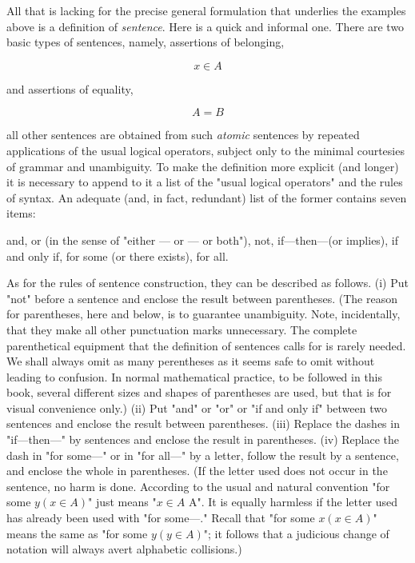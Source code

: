 All that is lacking for the precise general formulation that underlies the examples above is a definition of \textit{sentence}. Here is a quick and informal one. There are two basic types of sentences, namely, assertions of belonging,

\begin{equation*}
x \in A
\end{equation*}

and assertions of equality, 

\begin{equation*}
A = B
\end{equation*}

all other sentences are obtained from such \textit{atomic} sentences by repeated applications of the usual logical operators, subject only to the minimal courtesies of grammar and unambiguity. To make the definition more explicit (and longer) it is necessary to append to it a list of the "usual logical operators" and the rules of syntax. An adequate (and, in fact, redundant) list of the former contains seven items:
 
and, 
or (in the sense of "either — or — or both"), 
not, 
if—then—(or implies),
if and only if,
for some (or there exists),
for all. 

As for the rules of sentence construction, they can be described as follows. (i) Put "not" before a sentence and enclose the result between parentheses. (The reason for parentheses, here and below, is to guarantee unambiguity. Note, incidentally, that they make all other punctuation marks unnecessary. The complete parenthetical equipment that the definition of sentences calls for is rarely needed. We shall always omit as many perentheses as it seems safe to omit without leading to confusion. In normal mathematical practice, to be followed in this book, several different sizes and shapes of parentheses are used, but that is for visual convenience only.) (ii) Put "and" or "or" or "if and only if" between two sentences and enclose the result between parentheses. (iii) Replace the dashes in "if—then—" by sentences and enclose the result in parentheses. (iv) Replace the dash in "for some—" or in "for all—" by a letter, follow the result by a sentence, and enclose the whole in parentheses. (If the letter used does not occur in the sentence, no harm is done. According to the usual and natural convention "for some $y (x \in A)$" just means "$ x \in A$ A". It is equally harmless if the letter used has already been used with "for some—." Recall that "for some $x (x \in A)$" means the same as  "for some $ y (y \in A)$"; it follows that a judicious change of notation will always avert alphabetic collisions.)


